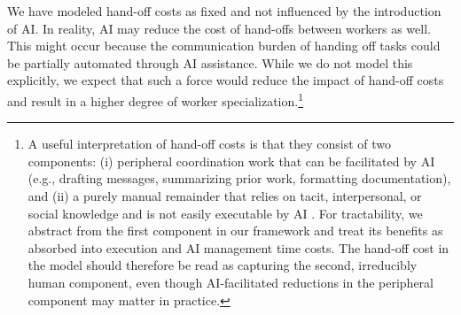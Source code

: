 We have modeled hand-off costs as fixed and not influenced by the introduction of AI. 
In reality, AI may reduce the cost of hand-offs between workers as well. 
This might occur because the communication burden of handing off tasks could be partially automated through AI assistance. 
While we do not model this explicitly, we expect that such a force would reduce the impact of hand-off costs and result in a higher degree of worker specialization.\footnote{
A useful interpretation of hand-off costs is that they consist of two components: (i) peripheral coordination work that can be facilitated by AI (e.g., drafting messages, summarizing prior work, formatting documentation), and (ii) a purely manual remainder that relies on tacit, interpersonal, or social knowledge and is not easily executable by AI \citep{deming2017growing}. 
For tractability, we abstract from the first component in our framework and treat its benefits as absorbed into execution and AI management time costs. 
The hand-off cost in the model should therefore be read as capturing the second, irreducibly human component, even though AI-facilitated reductions in the peripheral component may matter in practice.
}
